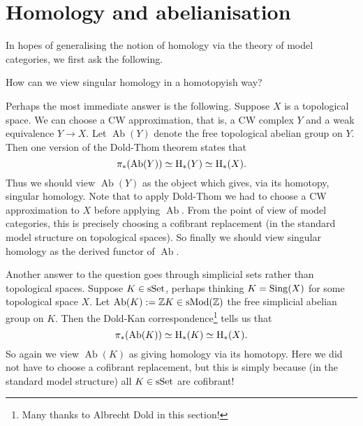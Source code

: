 
\section{Homology and abelianisation}
\label{homology-abelian}

In hopes of generalising the notion of homology via the theory of
model categories, we first ask the following.

\begin{question}
  How can we view singular homology in a homotopyish way?
\end{question}

\renewcommand{\Ab}{\operatorname{Ab}}
\newcommand{\ab}{\mathrm{ab}}

\begin{nothing}
  \label{sing-doldthom}
  Perhaps the most immediate answer is the following. Suppose $X$ is a
  topological space. We can choose a CW approximation, that is, a CW
  complex $Y$ and a weak equivalence $Y \to X$. Let $\Ab(Y)$ denote
  the free topological abelian group on $Y$. Then one version of the
  Dold-Thom theorem \cite{mccord-doldthom} states that
  \[
  \pi_*(\Ab(Y)) \simeq \H_*(Y) \simeq \H_*(X).
  \]
  Thus we should view $\Ab(Y)$ as the object which gives, via its
  homotopy, singular homology. Note that to apply Dold-Thom we had to
  choose a CW approximation to $X$ before applying $\Ab$. From the
  point of view of model categories, this is precisely choosing a
  cofibrant replacement (in the standard model structure on
  topological spaces). So finally we should view singular homology as
  the derived functor of $\Ab$.
\end{nothing}

\begin{nothing}
  \label{sing-doldkan}
  Another answer to the question goes through simplicial sets rather
  than topological spaces. Suppose $K \in \mathrm{s}\mathrm{Set}$, perhaps thinking $K =
  \operatorname{Sing}(X)$ for some topological space $X$. Let $\Ab(K) \ce \Z
  K\in \s\Mod(\Z)$ the free simplicial abelian group on $K$.  Then the
  Dold-Kan correspondence\footnote{Many thanks to Albrecht Dold in this
    section!} tells us that
  \[
  \pi_*(\Ab(K)) \simeq \H_*(K) \simeq \H_*(X).
  \]
  So again we view $\Ab(K)$ as giving homology via its homotopy. Here
  we did not have to choose a cofibrant replacement, but this is
  simply because (in the standard model structure) all $K \in \mathrm{s}\mathrm{Set}$
  are cofibrant!
\end{nothing}

